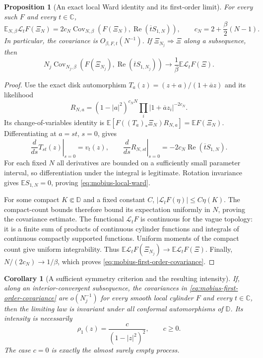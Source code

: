 \documentclass[11pt,a4paper]{article}
\numberwithin{equation}{section}
\newtheorem{proposition}[theorem]{Proposition}
\newtheorem{corollary}[theorem]{Corollary}
\theoremstyle{definition}
\theoremstyle{remark}
\newcommand{\D}{\mathbb D}
\newcommand{\C}{\mathbb C}
\begin{document}
\begin{proposition}[An exact local Ward identity and its first-order limit]
\label{prop:mobius-local-ward}
For every such $F$ and every $t\in\C$,
\begin{equation}\label{eq:mobius-local-ward}
 \mathbb E_{N,\beta}\mathcal L_tF(\Xi_N)
 =2c_N\operatorname{Cov}_{N,\beta}
       \left(F(\Xi_N),\operatorname{Re}(\overline t S_{1,N})\right),
 \qquad c_N=2+\frac\beta2(N-1).
\end{equation}
In particular, the covariance is $O_{\beta,F,t}(N^{-1})$.
If $\Xi_{N_j}\Rightarrow\Xi$ along a subsequence, then
\begin{equation}\label{eq:mobius-first-order-covariance}
 N_j\operatorname{Cov}_{N_j,\beta}
       \left(F(\Xi_{N_j}),\operatorname{Re}(\overline t S_{1,N_j})\right)
 \longrightarrow\frac1\beta\mathbb E\mathcal L_tF(\Xi).
\end{equation}
\end{proposition}

\begin{proof}
Use the exact disk automorphism
$T_a(z)=(z+a)/(1+\overline a z)$ and its likelihood
\[
 R_{N,a}=(1-|a|^2)^{c_NN}\prod_i|1+\overline a z_i|^{-2c_N}.
\]
Its change-of-variables identity is
$\mathbb E[F((T_a)_*\Xi_N)R_{N,a}]=\mathbb EF(\Xi_N)$.
Differentiating at $a=st$, $s=0$, gives
\[
 \left.\frac d{ds}T_{st}(z)\right|_{s=0}=v_t(z),\qquad
 \left.\frac d{ds}R_{N,st}\right|_{s=0}
       =-2c_N\operatorname{Re}(\overline t S_{1,N}).
\]
For each fixed $N$ all derivatives are bounded on a sufficiently small
parameter interval, so differentiation under the integral is legitimate.
Rotation invariance gives $\mathbb ES_{1,N}=0$, proving
\eqref{eq:mobius-local-ward}.

For some compact $K\Subset\D$ and a fixed constant $C$,
$|\mathcal L_tF(\eta)|\leq C\eta(K)$. The compact-count bounds therefore
bound its expectation uniformly in $N$, proving the covariance estimate.
The functional $\mathcal L_tF$ is continuous for the vague topology:
it is a finite sum of products of continuous cylinder functions and
integrals of continuous compactly supported functions. Uniform moments
of the compact count give uniform integrability. Thus
$\mathbb E\mathcal L_tF(\Xi_{N_j})\to\mathbb E\mathcal L_tF(\Xi)$.
Finally, $N/(2c_N)\to1/\beta$, which proves
\eqref{eq:mobius-first-order-covariance}.
\end{proof}

\begin{corollary}[A sufficient symmetry criterion and the resulting intensity]
\label{cor:mobius-invariance-criterion}
If, along an interior-convergent subsequence, the covariances in
\eqref{eq:mobius-first-order-covariance} are $o(N_j^{-1})$ for every
smooth local cylinder $F$ and every $t\in\C$, then the limiting law is
invariant under all conformal automorphisms of $\D$. Its intensity is
necessarily
\[
 \rho_1(z)=\frac{c}{(1-|z|^2)^2},\qquad c\geq0.
\]
The case $c=0$ is exactly the almost surely empty process.
\end{corollary}
\end{document}
